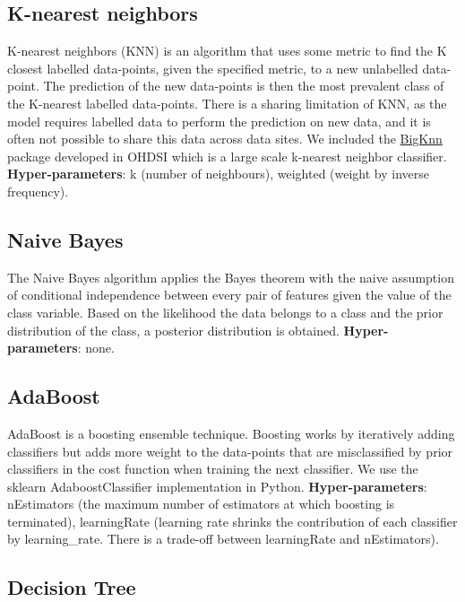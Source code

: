 \documentclass[11pt]{book}
\theoremstyle{definition}
\theoremstyle{definition}
\theoremstyle{definition}
\theoremstyle{remark}
\begin{document}
\hypertarget{k-nearest-neighbors}{%
\subsection{K-nearest neighbors}\label{k-nearest-neighbors}}

K-nearest neighbors (KNN) is an algorithm that uses some metric to find the K closest labelled data-points, given the specified metric, to a new unlabelled data-point. The prediction of the new data-points is then the most prevalent class of the K-nearest labelled data-points. There is a sharing limitation of KNN, as the model requires labelled data to perform the prediction on new data, and it is often not possible to share this data across data sites. We included the \href{https://github.com/OHDSI/BigKnn}{BigKnn} package developed in OHDSI which is a large scale k-nearest neighbor classifier. \textbf{Hyper-parameters}: k (number of neighbours), weighted (weight by inverse frequency).

\hypertarget{naive-bayes}{%
\subsection{Naive Bayes}\label{naive-bayes}}

The Naive Bayes algorithm applies the Bayes theorem with the naive assumption of conditional independence between every pair of features given the value of the class variable. Based on the likelihood the data belongs to a class and the prior distribution of the class, a posterior distribution is obtained. \textbf{Hyper-parameters}: none.

\hypertarget{adaboost}{%
\subsection{AdaBoost}\label{adaboost}}

AdaBoost is a boosting ensemble technique. Boosting works by iteratively adding classifiers but adds more weight to the data-points that are misclassified by prior classifiers in the cost function when training the next classifier. We use the sklearn AdaboostClassifier implementation in Python. \textbf{Hyper-parameters}: nEstimators (the maximum number of estimators at which boosting is terminated), learningRate (learning rate shrinks the contribution of each classifier by learning\_rate. There is a trade-off between learningRate and nEstimators).

\hypertarget{decision-tree}{%
\subsection{Decision Tree}\label{decision-tree}}
\end{document}
